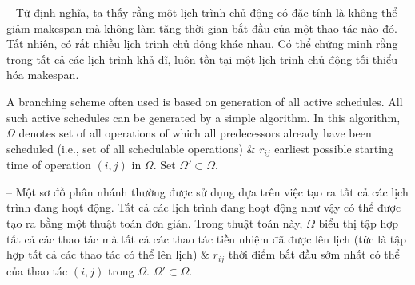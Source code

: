 \documentclass{article}
\begin{document}
\begin{itemize}
\begin{itemize}
        -- Từ định nghĩa, ta thấy rằng một lịch trình chủ động có đặc tính là không thể giảm makespan mà không làm tăng thời gian bắt đầu của một thao tác nào đó. Tất nhiên, có rất nhiều lịch trình chủ động khác nhau. Có thể chứng minh rằng trong tất cả các lịch trình khả dĩ, luôn tồn tại một lịch trình chủ động tối thiểu hóa makespan.

        A branching scheme often used is based on generation of all active schedules. All such active schedules can be generated by a simple algorithm. In this algorithm, $\Omega$ denotes set of all operations of which all predecessors already have been scheduled (i.e., set of all schedulable operations) \& $r_{ij}$ earliest possible starting time of operation $(i,j)$ in $\Omega$. Set $\Omega'\subset\Omega$.

        -- Một sơ đồ phân nhánh thường được sử dụng dựa trên việc tạo ra tất cả các lịch trình đang hoạt động. Tất cả các lịch trình đang hoạt động như vậy có thể được tạo ra bằng một thuật toán đơn giản. Trong thuật toán này, $\Omega$ biểu thị tập hợp tất cả các thao tác mà tất cả các thao tác tiền nhiệm đã được lên lịch (tức là tập hợp tất cả các thao tác có thể lên lịch) \& $r_{ij}$ thời điểm bắt đầu sớm nhất có thể của thao tác $(i,j)$ trong $\Omega$. $\Omega'\subset\Omega$.


\end{itemize}
\end{itemize}
\end{document}
